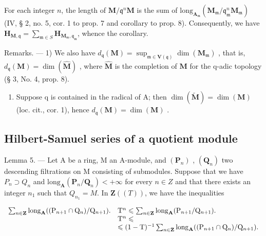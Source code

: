 For each integer \(n\), the length of \(\mathbf{M} / \mathfrak{q}^n\mathbf{M}\) is the sum of \(\mathrm{long}_{\mathbf{A}_{\mathfrak{m}}}(\mathbf{M}_{\mathfrak{m}} / \mathfrak{q}_{\mathfrak{m}}^n\mathbf{M}_{\mathfrak{m}})\) (IV, § 2, no. 5, cor. 1 to prop. 7 and corollary to prop. 8). Consequently, we have \(\mathbf{H}_{\mathbf{M},\mathfrak{q}} = \sum_{\mathfrak{m}\in S}\mathbf{H}_{\mathbf{M}_{\mathfrak{m}},\mathfrak{q}_{\mathfrak{m}}}\), whence the corollary.

Remarks. --- 1) We also have \(d_{\mathfrak{q}}(\mathbf{M}) = \sup_{\mathfrak{m} \in \mathbf{V}(\mathfrak{q})} \dim(\mathbf{M}_{\mathfrak{m}})\) , that is, \(d_{\mathfrak{q}}(\mathbf{M}) = \dim(\hat{\mathbf{M}})\) , where \(\hat{\mathbf{M}}\) is the completion of \(\mathbf{M}\) for the q-adic topology (§ 3, No. 4, prop. 8).

\begin{enumerate}
\def\labelenumi{\arabic{enumi})}
\setcounter{enumi}{1}
\tightlist
\item
  Suppose q is contained in the radical of A; then \(\dim(\tilde{\mathbf{M}})=\dim(\mathbf{M})\) (loc. cit., cor. 1), hence \(d_{\mathfrak{q}}(\mathbf{M})=\dim(\mathbf{M})\) .
\end{enumerate}

\subsection{Hilbert-Samuel series of a quotient module}

Lemma 5. — Let A be a ring, M an A-module, and \((\mathbf{P}_{n})\) , \((\mathbf{Q}_{n})\) two descending filtrations on M consisting of submodules. Suppose that we have \(P_{n} \supset Q_{n}\) and \(\text{long}_{\mathbf{A}}(\mathbf{P}_{n}/\mathbf{Q}_{n}) < +\infty\) for every \(n \in Z\) and that there exists an integer \(n_{1}\) such that \(Q_{n_{1}} = M\). In \(\mathbf{Z}((T))\), we have the inequalities

\[
\begin{array}{r l} \sum_ {n \in \mathbf {Z}} \mathrm{long} _ {\mathbf {A}} ((\mathrm{P} _ {n + 1} \cap \mathrm{Q} _ {n}) / \mathrm{Q} _ {n + 1}). & \mathrm{T} ^ {n} \leqslant \sum_ {n \in \mathbf {Z}} \mathrm{long} _ {\mathbf {A}} (\mathrm{P} _ {n + 1} / \mathrm{Q} _ {n + 1}). \\ & \mathrm{T} ^ {n} \leqslant \\ & \leqslant (1 - \mathrm{T}) ^ {- 1} \sum_ {n \in \mathbf {Z}} \mathrm{long} _ {\mathbf {A}} ((\mathrm{P} _ {n + 1} \cap \mathrm{Q} _ {n}) / \mathrm{Q} _ {n + 1}). \end{array}
\]


